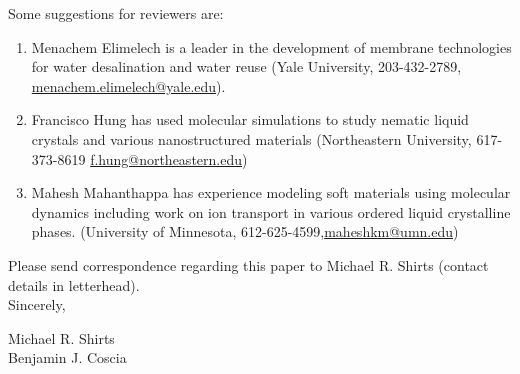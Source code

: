 \documentclass[fontsize=11pt]{article}
\begin{document}
	\noindent Some suggestions for reviewers are:
	\begin{enumerate}

		\item Menachem Elimelech is a leader in the development of membrane technologies
		for	water desalination and water reuse (Yale University, 203-432-2789,
		\href{mailto:menachem.elimelech@yale.edu}{menachem.elimelech@yale.edu}).
	
		\item Francisco Hung has used molecular simulations to study nematic liquid crystals
		and various	nanostructured materials (Northeastern University, 617-373-8619 	
		\href{mailto:f.hung@northeastern.edu}{f.hung@northeastern.edu})
		
		\item Mahesh Mahanthappa has experience modeling soft materials using molecular dynamics
		including work on ion transport in various ordered liquid crystalline phases. 
		(University of Minnesota, 612-625-4599,\href{mailto:maheshkm@umn.edu}{maheshkm@umn.edu})
		
	\end{enumerate}
	
	\noindent Please send correspondence regarding this paper to Michael R. Shirts (contact
	details in letterhead).\\	
	
	\noindent Sincerely,
	
	\noindent Michael R. Shirts \\
	\noindent Benjamin J. Coscia \\
	
\end{document}
